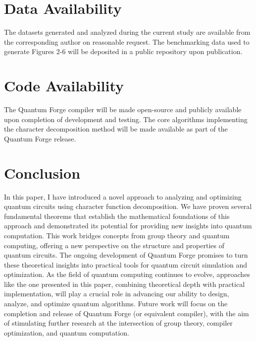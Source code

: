 \documentclass[11pt,a4paper]{article}
\begin{document}
\section{Data Availability}
The datasets generated and analyzed during the current study are available from the corresponding author on reasonable request. The benchmarking data used to generate Figures 2-6 will be deposited in a public repository upon publication.

\section{Code Availability}
The Quantum Forge compiler will be made open-source and publicly available upon completion of development and testing. The core algorithms implementing the character decomposition method will be made available as part of the Quantum Forge release.


\section{Conclusion}
In this paper, I have introduced a novel approach to analyzing and optimizing quantum circuits using character function decomposition. We have proven several fundamental theorems that establish the mathematical foundations of this approach and demonstrated its potential for providing new insights into quantum computation.
This work bridges concepts from group theory and quantum computing, offering a new perspective on the structure and properties of quantum circuits. The ongoing development of Quantum Forge promises to turn these theoretical insights into practical tools for quantum circuit simulation and optimization.
As the field of quantum computing continues to evolve, approaches like the one presented in this paper, combining theoretical depth with practical implementation, will play a crucial role in advancing our ability to design, analyze, and optimize quantum algorithms. Future work will focus on the completion and release of Quantum Forge (or equivalent compiler), with the aim of stimulating further research at the intersection of group theory, compiler optimization, and quantum computation.


\end{document}
